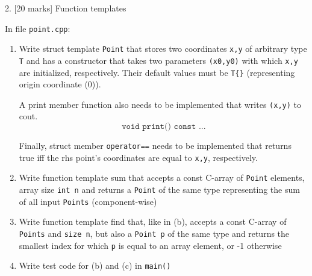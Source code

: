 \documentclass[a4paper,11pt]{article}
\begin{document}
\bigskip

\linerule 


\bigskip

2. [20 marks] Function templates

\bigskip 

In file \texttt{point.cpp}:
\begin{enumerate}[label=\alph*)]
\item Write struct template \texttt{Point} that stores two coordinates \texttt{x,y} of arbitrary
type \texttt{T} and has a constructor that takes two parameters \texttt{(x0,y0)} with which
\texttt{x,y} are initialized, respectively. Their default values must be \texttt{T\{\}}
(representing origin coordinate (0)).

\medskip

A print member function also needs to be implemented that writes \texttt{(x,y)} to
cout.
\[ \texttt{void print() const ...} \]

\medskip

Finally, struct member \texttt{operator==} needs to be implemented that returns true
iff the rhs point's coordinates are equal to \texttt{x,y}, respectively.

\item Write function template sum that accepts a const C-array of \texttt{Point} elements,
    array size \texttt{int n} and returns a \texttt{Point} of the same type representing the sum
    of all input \texttt{Points} (component-wise)
\item Write function template find that, like in (b), accepts a const C-array of
    \texttt{Points} and \texttt{size n}, but also a \texttt{Point p} of the same type and returns the
    smallest index for which \texttt{p} is equal to an array element, or -1 otherwise
\item Write test code for (b) and (c) in \texttt{main()}
\end{enumerate}
\end{document}
